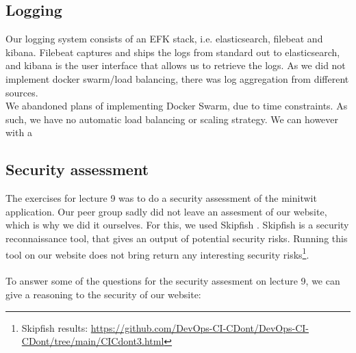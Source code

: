 \subsection{Logging}
Our logging system consists of an EFK stack, i.e. elasticsearch, filebeat and kibana. Filebeat captures and ships the logs from standard out to  elasticsearch, and kibana is the user interface that allows us to retrieve the logs. As we did not implement docker swarm/load balancing, there was log aggregation from different sources. \\
We abandoned plans of implementing Docker Swarm, due to time constraints. As such, we have no automatic load balancing or scaling strategy. We can however with a 
\subsection{Security assessment}
The exercises for lecture 9 was to do a security assessment of the minitwit application. Our peer group sadly did not leave an assesment of our website, which is why we did it ourselves. For this, we used Skipfish \cite{skipfish}. Skipfish is a security reconnaissance tool, that gives an output of potential security risks. Running this tool on our website does not bring return any interesting security risks\footnote{Skipfish results: \url{https://github.com/DevOps-CI-CDont/DevOps-CI-CDont/tree/main/CICdont3.html}}.
\\\\
To answer some of the questions for the security assesment on lecture 9, we can give a reasoning to the security of our website:

